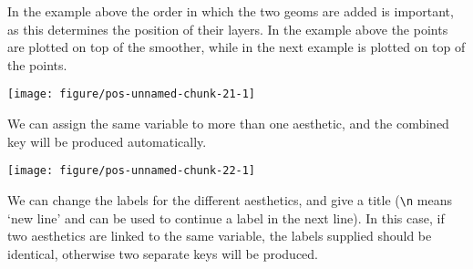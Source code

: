 \documentclass[paper=a4,10pt,div=17,headsepline,BCOR=12mm,twoside,open=right]{scrbook}\usepackage{knitr}
\begin{document}
In the example above the order in which the two geoms are added is important, as this determines the position of their layers. In the example above the points are plotted on top of the smoother, while in the next example  is plotted on top of the points.

\begin{knitrout}\footnotesize
{}\color{fgcolor}\begin{kframe}
\begin{alltt}
\hlstd{(}  \hlstd{(}  \hlstd{=} \hlopt{+}
  \hlstd{()} \hlopt{+}
  \hlstd{(}\hlstd{=}\hlstd{)}
\end{alltt}
\end{kframe}

{\centering \texttt{[image: figure/pos-unnamed-chunk-21-1]} 

}



\end{knitrout}

We can assign the same variable to more than one aesthetic, and the combined key will be produced automatically.

\begin{knitrout}\footnotesize
{}\color{fgcolor}\begin{kframe}
\begin{alltt}
\hlstd{(} 
       \hlstd{(}  \hlstd{=}
           \hlstd{=} \hlopt{+}
  \hlstd{()}
\end{alltt}
\end{kframe}

{\centering \texttt{[image: figure/pos-unnamed-chunk-22-1]} 

}



\end{knitrout}

We can change the labels for the different aesthetics, and give a title (\verb!\n! means `new line' and can be used to continue a label in the next line). In this case, if two aesthetics are linked to the same variable, the labels supplied should be identical, otherwise two separate keys will be produced.
\end{document}
